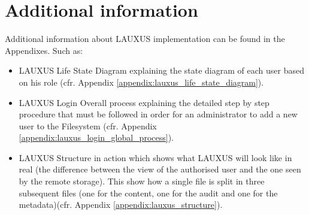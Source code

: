 \documentclass[../main.tex]{subfiles}
\begin{document}
\section{Additional information}
\par Additional information about LAUXUS implementation can be found in the Appendixes. Such as:
\begin{itemize}
    \item LAUXUS Life State Diagram explaining the state diagram of each user based on his role (cfr. Appendix \ref{appendix:lauxus_life_state_diagram}).
    \item LAUXUS Login Overall process explaining the detailed step by step procedure that must be followed in order for an administrator to add a new user to the Filesystem (cfr. Appendix \ref{appendix:lauxus_login_global_process}).
    \item LAUXUS Structure in action which shows what LAUXUS will look like in real (the difference between the view of the authorised user and the one seen by the remote storage). This show how a single file is split in three subsequent files (one for the content, one for the audit and one for the metadata)(cfr. Appendix \ref{appendix:lauxus_structure}).
\end{itemize}
\end{document}
